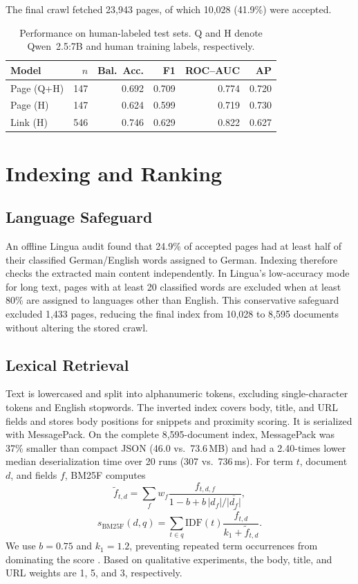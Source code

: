 \documentclass{article}
\begin{document}
The final crawl fetched 23,943 pages, of which 10,028 (41.9\%) were accepted.

\begin{table}[t]
  \centering
  \caption{Performance on human-labeled test sets. Q and H denote
  Qwen~2.5:7B and human training labels, respectively.}
  \label{tab:verdict-benchmark}
  \small
  \setlength{\tabcolsep}{3pt}
  \begin{tabular}{@{}lrrrrr@{}}
    \toprule
    Model & $n$ & Bal.\ Acc. & F1 & ROC--AUC & AP \\
    \midrule
    Page (Q+H) & 147 & 0.692 & 0.709 & 0.774 & 0.720 \\
    Page (H) & 147 & 0.624 & 0.599 & 0.719 & 0.730 \\
    Link (H) & 546 & 0.746 & 0.629 & 0.822 & 0.627 \\
    \bottomrule
  \end{tabular}
\end{table}

\section{Indexing and Ranking}

\subsection{Language Safeguard}
An offline Lingua audit \citep{lingua} found that 24.9\% of accepted pages had
at least half of their classified German/English words assigned to German.
Indexing therefore checks the extracted main content independently. In
Lingua's low-accuracy mode for long text, pages with at least 20 classified
words are excluded when at least 80\% are assigned to languages other than
English. This conservative safeguard excluded 1,433 pages, reducing the final
index from 10,028 to 8,595 documents without altering the stored crawl.

\subsection{Lexical Retrieval}
Text is lowercased and split into alphanumeric tokens, excluding single-character
tokens and English stopwords. The inverted index covers body,
title, and URL fields and stores body positions for snippets and proximity
scoring. It is serialized with MessagePack. On the complete 8,595-document
index, MessagePack was 37\% smaller than compact JSON (46.0 vs.\ 73.6\,MB) and
had a 2.40-times lower median deserialization time over 20 runs (307 vs.\
736\,ms). For term $t$, document $d$, and fields $f$, BM25F computes
\[
\tilde f_{t,d}=\sum_f w_f
\frac{f_{t,d,f}}{1-b+b\,|d_f|/\overline{|d_f|}},
\]
\[
s_{\mathrm{BM25F}}(d,q)=
\sum_{t\in q}\mathrm{IDF}(t)\frac{\tilde f_{t,d}}{k_1+\tilde f_{t,d}}.
\]
We use $b=0.75$ and $k_1=1.2$, preventing repeated term occurrences from
dominating the score \citep{robertson2004bm25f}. Based on qualitative experiments,
the body, title, and URL weights are 1, 5, and 3, respectively.
\end{document}
